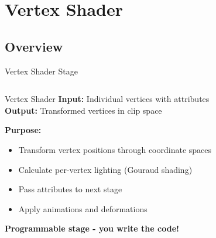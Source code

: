 \section{Vertex Shader}

\subsection{Overview}
\begin{frame}{Vertex Shader Stage}
  \small
  \begin{columns}
    \begin{column}{0.6\textwidth}
      \begin{raybox}{Vertex Shader}
        \textbf{Input:} Individual vertices with attributes \\
        \textbf{Output:} Transformed vertices in clip space

        \vspace{0.3cm}
        \textbf{Purpose:}
        \begin{itemize}
          \item Transform vertex positions through coordinate spaces
          \item Calculate per-vertex lighting (Gouraud shading)
          \item Pass attributes to next stage
          \item Apply animations and deformations
        \end{itemize}

        \vspace{0.2cm}
        \textcolor{PrimaryColor}{\textbf{Programmable stage - you write the code!}}
      \end{raybox}
    \end{column}
    \begin{column}{0.4\textwidth}
\end{column}
\end{columns}
\end{frame}

